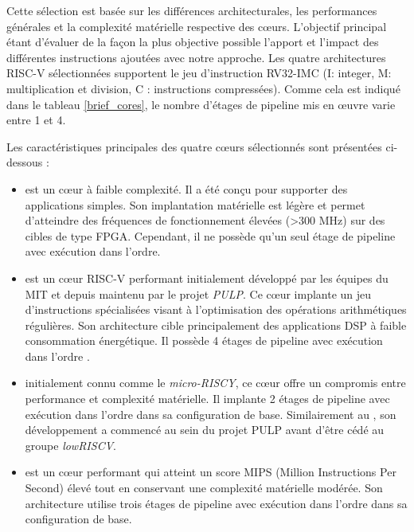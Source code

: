 \documentclass[../main.tex]{subfiles}
\begin{document}
Cette sélection est basée sur les différences architecturales, les performances générales et la complexité matérielle respective des cœurs. L'objectif principal étant d’évaluer de la façon la plus objective possible l'apport et l'impact des différentes instructions ajoutées avec notre approche. 
Les quatre architectures RISC-V sélectionnées supportent le jeu d'instruction RV32-IMC (I: integer, M: multiplication et division, C : instructions compressées). Comme cela est indiqué dans le tableau \ref{brief_cores}, le nombre d'étages de pipeline mis en œuvre varie entre 1 et 4.

Les caractéristiques principales des quatre cœurs sélectionnés sont présentées ci-dessous : 

\begin{itemize}
    \item {\PicoRV \cite{wolf_cliffordwolfpicorv32_2021} est un cœur à faible complexité. Il a été conçu pour supporter des applications simples. Son implantation matérielle est légère et permet d'atteindre des fréquences de fonctionnement élevées (>300 MHz) sur des cibles de type FPGA. Cependant, il ne possède qu'un seul étage de pipeline avec exécution dans l'ordre.}
 
    \item {\RISCY \cite{cite_riscy} est un cœur RISC-V performant initialement développé par les équipes du MIT et depuis maintenu par le projet \textit{PULP}. Ce cœur implante un jeu d'instructions spécialisées visant à l'optimisation des opérations arithmétiques régulières. Son architecture cible principalement des applications DSP à faible consommation énergétique. Il possède 4 étages de pipeline avec exécution dans l'ordre \cite{cite_riscy_url}.}

    \item {\IBEX \cite{noauthor_lowriscibex_2021, schiavone_slow_2017} initialement connu comme le \textit{micro-RISCY}, ce cœur offre un compromis entre performance et complexité matérielle. Il implante 2 étages de pipeline avec exécution dans l'ordre dans sa configuration de base. Similairement au \RISCY, son développement a commencé au sein du projet PULP avant d'être cédé au groupe \textit{lowRISCV}.}

    \item {\SCR \cite{noauthor_syntacorescr1_2021} est un cœur performant qui atteint un score MIPS (Million Instructions Per Second) élevé tout en conservant une complexité matérielle modérée. Son architecture utilise trois étages de pipeline avec exécution dans l'ordre dans sa configuration de base.} 


\end{itemize}
\end{document}

